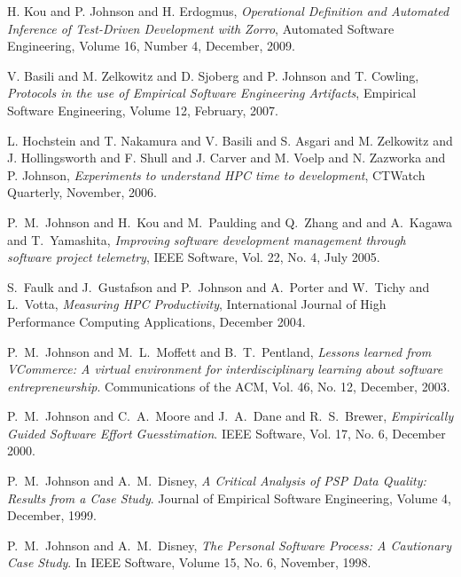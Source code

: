 \begin{Journal Publications}

\item H. Kou and P. Johnson and H. Erdogmus, 
{\em Operational Definition and Automated Inference of Test-Driven Development with Zorro},
Automated Software Engineering, Volume 16, Number 4, December, 2009.

\item V. Basili and M. Zelkowitz and D. Sjoberg and P. Johnson and T. Cowling,
{\em Protocols in the use of Empirical Software Engineering Artifacts}, 
Empirical Software Engineering, Volume 12, February, 2007.

\item L. Hochstein and T. Nakamura and V. Basili and S. Asgari and 
M. Zelkowitz and J. Hollingsworth and F. Shull and J. Carver and 
M. Voelp and N. Zazworka and P. Johnson, {\em Experiments to 
understand HPC time to development}, CTWatch Quarterly, 
November, 2006.

\item P.~M.~Johnson and H.~Kou and M.~Paulding and Q.~Zhang and
and A.~Kagawa and T.~Yamashita, {\em Improving software development
management through software project telemetry}, 
IEEE Software, Vol. 22, No. 4, July 2005.

\item S.~Faulk and J.~Gustafson and P.~Johnson and A.~Porter and W.~Tichy 
and L.~Votta, {\em Measuring {HPC} Productivity}, 
International Journal of High Performance Computing Applications, December 2004. 

\item P.~M.~Johnson and M.~L.~Moffett and B.~T.~Pentland, {\em
Lessons learned from VCommerce: A virtual
environment for interdisciplinary learning about software entrepreneurship}.
Communications of the ACM, Vol. 46, No. 12, December, 2003.

\item P.~M.~Johnson and C.~A.~Moore and J.~A.~Dane and R.~S.~Brewer, {\em
Empirically Guided Software Effort Guesstimation}.
IEEE Software, Vol. 17, No. 6, December 2000.

\item P.~M.~Johnson and A.~M.~Disney, {\em A Critical Analysis of PSP Data Quality: Results from a Case Study}.
Journal of Empirical Software Engineering, Volume 4, December, 1999.


\item P.~M.~Johnson and A.~M.~Disney, {\em The Personal Software Process: 
A Cautionary Case Study}.
  In IEEE Software, Volume 15, No. 6, 
  November, 1998.


\end{Journal Publications}
